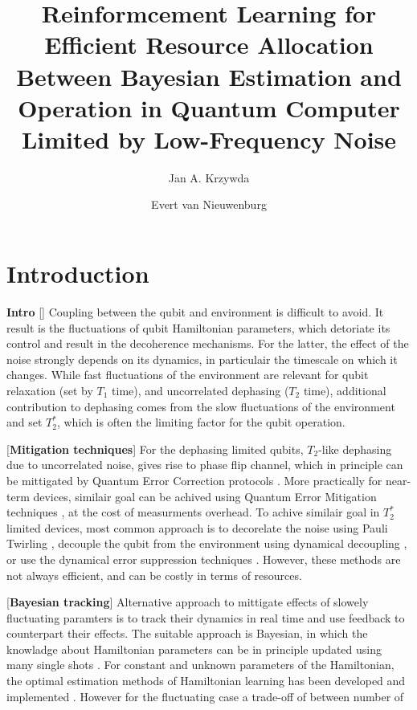 \documentclass[aps,twocolumn,pra,notitlepage,]{revtex4-2}
\begin{document}
\author{Jan A. Krzywda}
\author{Evert van Nieuwenburg}

\title{Reinformcement Learning for Efficient Resource Allocation Between Bayesian Estimation and Operation in Quantum Computer Limited by Low-Frequency Noise} 


\begin{abstract}

\end{abstract}
\maketitle

\section{Introduction}
\textbf{Intro} 
[] Coupling between the qubit and environment is difficult to avoid. It result is the fluctuations of qubit Hamiltonian parameters, which detoriate its control and result in the decoherence mechanisms. For the latter, the effect of the noise strongly depends on its dynamics, in particulair the timescale on which it changes. While fast fluctuations of the environment are relevant for qubit relaxation (set by $T_1$ time), and uncorrelated dephasing ($T_2$ time), additional contribution to dephasing comes from the slow fluctuations of the environment and set $T_2^*$, which is often the limiting factor for the qubit operation.

[\textbf{Mitigation techniques}] For the dephasing limited qubits, $T_2$-like dephasing due to uncorrelated noise, gives rise to phase flip channel, which in principle can be mittigated by Quantum Error Correction protocols \cite{}. More practically for near-term devices, similair goal can be achived using Quantum Error Mitigation techniques \cite{}, at the cost of measurments overhead. To achive similair goal in $T_2^*$ limited devices, most common approach is to decorelate the noise using Pauli Twirling \cite{}, decouple the qubit from the environment using dynamical decoupling \cite{}, or use the dynamical error suppression techniques \cite{}. However, these methods are not always efficient, and can be costly in terms of resources. 

[\textbf{Bayesian tracking}]
Alternative approach to mittigate effects of slowely fluctuating paramters is to track their dynamics in real time and use feedback to counterpart their effects. The suitable approach is Bayesian, in which the knowladge about Hamiltonian parameters can be in principle updated using many single shots \cite{}. For constant and unknown parameters of the Hamiltonian, the optimal estimation methods of Hamiltonian learning has been developed \cite{} and implemented \cite{}. However for the fluctuating case a trade-off of between number of
\end{document}
